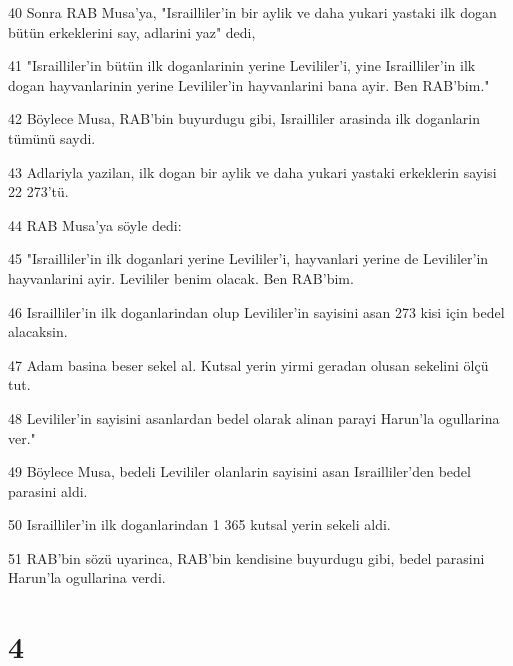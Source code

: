 \par 40 Sonra RAB Musa'ya, "Israilliler'in bir aylik ve daha yukari yastaki ilk dogan bütün erkeklerini say, adlarini yaz" dedi,
\par 41 "Israilliler'in bütün ilk doganlarinin yerine Levililer'i, yine Israilliler'in ilk dogan hayvanlarinin yerine Levililer'in hayvanlarini bana ayir. Ben RAB'bim."
\par 42 Böylece Musa, RAB'bin buyurdugu gibi, Israilliler arasinda ilk doganlarin tümünü saydi.
\par 43 Adlariyla yazilan, ilk dogan bir aylik ve daha yukari yastaki erkeklerin sayisi 22 273'tü.
\par 44 RAB Musa'ya söyle dedi:
\par 45 "Israilliler'in ilk doganlari yerine Levililer'i, hayvanlari yerine de Levililer'in hayvanlarini ayir. Levililer benim olacak. Ben RAB'bim.
\par 46 Israilliler'in ilk doganlarindan olup Levililer'in sayisini asan 273 kisi için bedel alacaksin.
\par 47 Adam basina beser sekel al. Kutsal yerin yirmi geradan olusan sekelini ölçü tut.
\par 48 Levililer'in sayisini asanlardan bedel olarak alinan parayi Harun'la ogullarina ver."
\par 49 Böylece Musa, bedeli Levililer olanlarin sayisini asan Israilliler'den bedel parasini aldi.
\par 50 Israilliler'in ilk doganlarindan 1 365 kutsal yerin sekeli aldi.
\par 51 RAB'bin sözü uyarinca, RAB'bin kendisine buyurdugu gibi, bedel parasini Harun'la ogullarina verdi.

\chapter{4}

